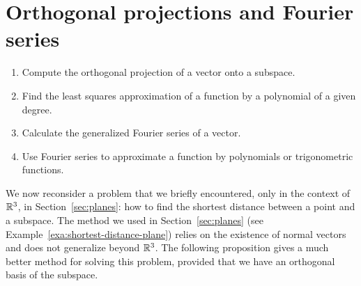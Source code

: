 \section{Orthogonal projections and Fourier series}

\begin{outcome}
  \begin{enumerate}
  \item Compute the orthogonal projection of a vector onto a subspace.
  \item Find the least squares approximation of a function by a
    polynomial of a given degree. 
  \item Calculate the generalized Fourier series of a vector.
  \item Use Fourier series to approximate a function by polynomials or
    trigonometric functions.
  \end{enumerate}
\end{outcome}

\begingroup


We now reconsider a problem that we briefly encountered, only in the
context of $\mathbb{R}^3$, in Section~\ref{sec:planes}: how to find the
shortest distance between a point and a subspace. The method we used
in Section~\ref{sec:planes} (see
Example~\ref{exa:shortest-distance-plane}) relies on the existence of
normal vectors and does not generalize beyond $\mathbb{R}^3$. The following
proposition gives a much better method for solving this problem,
provided that we have an orthogonal basis of the subspace.

